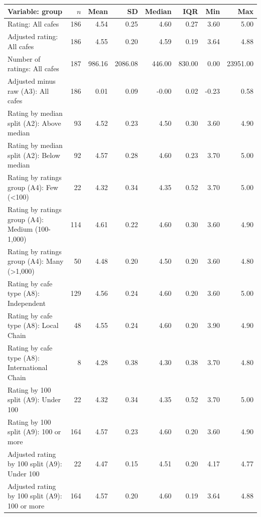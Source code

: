 \begin{tabular}{p{5.6cm}rrrrrrr}
\toprule
Variable: group & $n$ & Mean & SD & Median & IQR & Min & Max \\
\midrule
Rating: All cafes & 186 & 4.54 & 0.25 & 4.60 & 0.27 & 3.60 & 5.00 \\
Adjusted rating: All cafes & 186 & 4.55 & 0.20 & 4.59 & 0.19 & 3.64 & 4.88 \\
Number of ratings: All cafes & 187 & 986.16 & 2086.08 & 446.00 & 830.00 & 0.00 & 23951.00 \\
Adjusted minus raw (A3): All cafes & 186 & 0.01 & 0.09 & -0.00 & 0.02 & -0.23 & 0.58 \\
Rating by median split (A2): Above median & 93 & 4.52 & 0.23 & 4.50 & 0.30 & 3.60 & 4.90 \\
Rating by median split (A2): Below median & 92 & 4.57 & 0.28 & 4.60 & 0.23 & 3.70 & 5.00 \\
Rating by ratings group (A4): Few (\textless{}100) & 22 & 4.32 & 0.34 & 4.35 & 0.52 & 3.70 & 5.00 \\
Rating by ratings group (A4): Medium (100-1,000) & 114 & 4.61 & 0.22 & 4.60 & 0.30 & 3.60 & 4.90 \\
Rating by ratings group (A4): Many (\textgreater{}1,000) & 50 & 4.48 & 0.20 & 4.50 & 0.20 & 3.60 & 4.80 \\
Rating by cafe type (A8): Independent & 129 & 4.56 & 0.24 & 4.60 & 0.20 & 3.60 & 5.00 \\
Rating by cafe type (A8): Local Chain & 48 & 4.55 & 0.24 & 4.60 & 0.20 & 3.90 & 4.90 \\
Rating by cafe type (A8): International Chain & 8 & 4.28 & 0.38 & 4.30 & 0.38 & 3.70 & 4.80 \\
Rating by 100 split (A9): Under 100 & 22 & 4.32 & 0.34 & 4.35 & 0.52 & 3.70 & 5.00 \\
Rating by 100 split (A9): 100 or more & 164 & 4.57 & 0.23 & 4.60 & 0.20 & 3.60 & 4.90 \\
Adjusted rating by 100 split (A9): Under 100 & 22 & 4.47 & 0.15 & 4.51 & 0.20 & 4.17 & 4.77 \\
Adjusted rating by 100 split (A9): 100 or more & 164 & 4.57 & 0.20 & 4.60 & 0.19 & 3.64 & 4.88 \\
\bottomrule
\end{tabular}
